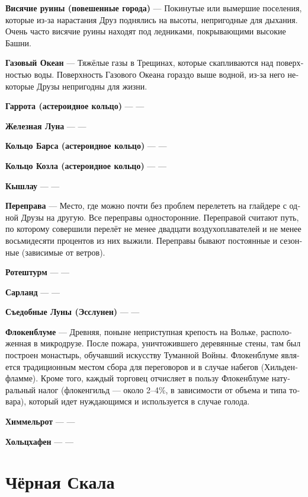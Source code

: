 \documentclass[a4paper,12pt,fleqn]{book}\usepackage{cooltooltips}\usepackage{polyglossia}\setdefaultlanguage[babelshorthands=true]{russian}\setotherlanguage{english}\defaultfontfeatures{Ligatures=TeX,Mapping=tex-text} \usepackage{xcolor}\definecolor{lightgray}{HTML}{bbbbbb}\color{lightgray}\newcommand{\ml}[3]{\textenglish{\textcolor{black}{#3}}}
\newcommand{\asterism}{\vspace{1em}{\centering\Large\bfseries$\ast~\ast~\ast$\par}\vspace{1em}}
\newcommand{\theterm}[3]{\textbf{\hypertarget{#1}{#2}} --- #3}
\begin{document}
\asterism

\theterm{townhenge}
{Висячие руины (повешенные города)}
{Покинутые или вымершие поселения, которые из-за нарастания Друз поднялись на высоты, непригодные для дыхания.
Очень часто висячие руины находят под ледниками, покрывающими высокие Башни.}

\theterm{gas-ocean}
{Газовый Океан}
{Тяжёлые газы в Трещинах, которые скапливаются над поверхностью воды.
Поверхность Газового Океана гораздо выше водной, из-за него некоторые Друзы непригодны для жизни.}

\theterm{garrota}
{Гаррота (астероидное кольцо)}
{---}

\theterm{eisenloon}
{Железная Луна}
{---}

\theterm{ounce-ring}
{Кольцо Барса (астероидное кольцо)}
{---}

\theterm{goat-ring}
{Кольцо Козла (астероидное кольцо)}
{---}

\theterm{qyschlau}
{Кышлау}
{---}

\theterm{crossing}
{Переправа}
{Место, где можно почти без проблем перелететь на глайдере с одной Друзы на другую.
Все переправы односторонние.
Переправой считают путь, по которому совершили перелёт не менее двадцати воздухоплавателей и не менее восьмидесяти процентов из них выжили.
Переправы бывают постоянные и сезонные (зависимые от ветров).}

\theterm{rotesturm}
{Ротештурм}
{---}

\theterm{sarland}
{Сарланд}
{---}

\theterm{essloonen}
{Съедобные Луны (Эсслунен)}{---}

\theterm{flockenblume}
{Флокенблуме}
{Древняя, поныне неприступная крепость на Вольке, расположенная в микродрузе. После пожара, уничтожившего деревянные стены, там был построен монастырь, обучавший искусству Туманной Войны. Флокенблуме является традиционным местом сбора для переговоров и в случае набегов (Хильденфламме). Кроме того, каждый торговец отчисляет в пользу Флокенблуме натуральный налог (флокенгильд --- около 2--4\%, в зависимости от объема и типа товара), который идет нуждающимся и используется в случае голода.}

\theterm{himmelrot}
{Химмельрот}
{---}

\theterm{holzhafen}
{Хольцхафен}
{---}

\section{Чёрная Скала}
\end{document}
